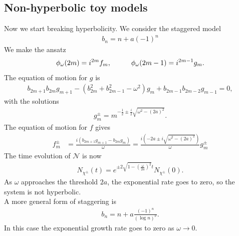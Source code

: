 \documentclass[JHEP,12pt]{article}
\begin{document}
\subsection{Non-hyperbolic toy models}
Now we start breaking hyperbolicity. We consider the staggered model
\begin{align}
b_n=n+a(-1)^n
\end{align}
We make the ansatz 
\begin{align}
\phi_\omega(2m)=i^{2m}f_m,\hspace{10 mm}\phi_\omega(2m-1)=i^{2m-1}g_{m}.
\end{align}
The equation of motion for $g$ is
\begin{align}
b_{2m+1}b_{2m}g_{m+1}-(b_{2m}^2+b_{2m-1}^2-\omega^2)g_{m}+b_{2m-1}b_{2m-2}g_{m-1}=0,
\end{align}
with the solutions 
\begin{align}
g^{\pm}_{m}=m^{-\frac{1}{2}\pm \frac{i}{2}\sqrt{\omega^2-(2a)^2}}.
\end{align}
The equation of motion for $f$ gives
\begin{align}
f^{\pm}_m&=\frac{i(b_{2m+1}g_{m+1}-b_{2m}g_m)}{\omega}=\frac{i(-2a\pm i\sqrt{\omega^2-(2a)^2})}{\omega}g^{\pm}_m
\end{align}
The time evolution of $\mathcal{N}$ is now
\begin{align}
N_{\chi^{\pm}}(t)=e^{\pm 2\sqrt{1-\left(\frac{\omega}{2a}\right)^2}t}N_{\chi^{\pm}}(0).
\end{align}
As $\omega$ approaches the threshold $2a$, the exponential rate goes to zero, so the system is not hyperbolic. \\
\indent A more general form of staggering is
\begin{align}
b_n=n+a\frac{(-1)^n}{(\log n)^\nu}. 
\end{align}
In this case the exponential growth rate goes to zero as $\omega\to 0$. 
\end{document}
